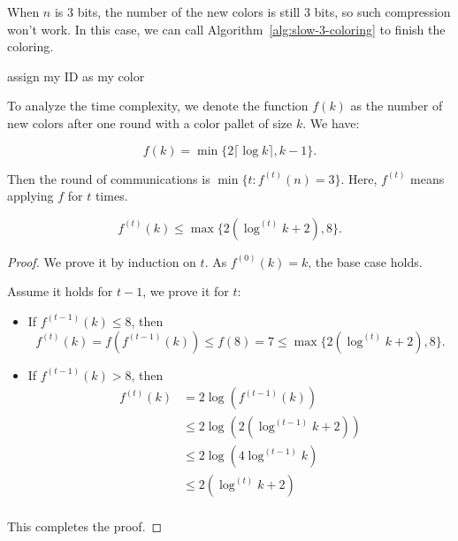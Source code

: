 When $n$ is 3 bits, the number of the new colors is still 3 bits, so such compression won't work. In this case, we can call Algorithm~\ref{alg:slow-3-coloring} to finish the coloring.

\begin{algorithm}[H]
  assign my ID as my color\;
  \caption{Deterministic 3-coloring Algorithm} \label{alg:det-3-coloring}
\end{algorithm}

To analyze the time complexity, we denote the function $f(k)$ as the number of new colors after one round with a color pallet of size $k$. We have:

\[
  f(k) = \min\{2\lceil \log k \rceil, k-1\}.
\]

Then the round of communications is $\min\{t : f^{(t)}(n) = 3\}$. Here, $f^{(t)}$ means applying $f$ for $t$ times.

\begin{lemma}
  \[
    f^{(t)}(k) \leq \max\{2(\log^{(t)} k + 2), 8\}.
  \]
\end{lemma}
\begin{proof}
  We prove it by induction on $t$. As $f^{(0)}(k) = k$, the base case holds.

  Assume it holds for $t-1$, we prove it for $t$:
  \begin{itemize}
  \item If $f^{(t-1)}(k) \leq 8$, then
    \[
      f^{(t)}(k) = f(f^{(t-1)}(k)) \leq f(8) = 7 \leq \max\{2(\log^{(t)} k + 2), 8\}.
    \]
  \item If $f^{(t-1)}(k) > 8$, then
    \begin{align*}
      f^{(t)}(k) &= 2 \log(f^{(t-1)}(k)) \\
      &\leq 2\log(2(\log^{(t-1)} k + 2)) \\
      &\leq 2\log(4\log^{(t-1)} k) \\
      &\leq 2(\log^{(t)} k + 2) \\
    \end{align*}
  \end{itemize}

  This completes the proof.
\end{proof}

